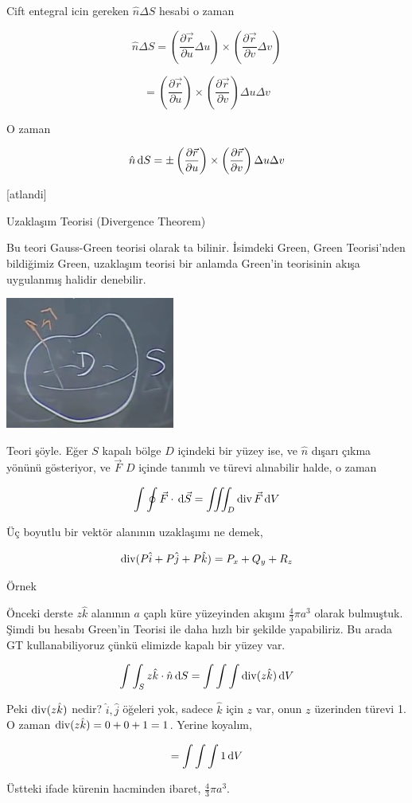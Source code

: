 \documentclass[12pt,fleqn]{article}\usepackage{../../common}
\begin{document}
Cift entegral icin gereken $\hat{n} \Delta S$ hesabi o zaman

$$
\hat{n} \Delta S =
\left( \frac{\partial \vec{r}}{\partial u} \Delta u \right) \times
\left( \frac{\partial \vec{r}}{\partial v} \Delta v \right) 
$$

$$
= \left( \frac{\partial \vec{r}}{\partial u} \right) \times
\left( \frac{\partial \vec{r}}{\partial v}  \right) \Delta u \Delta v
$$

O zaman

$$
\hat{n} \,\mathrm{d} S = \pm
\left( \frac{\partial \vec{r}}{\partial u} \right) \times
\left( \frac{\partial \vec{r}}{\partial v}  \right) \Delta u \Delta v
$$

[atlandi]

Uzaklaşım Teorisi (Divergence Theorem)

Bu teori Gauss-Green teorisi olarak ta bilinir. İsimdeki Green, Green
Teorisi'nden bildiğimiz Green, uzaklaşım teorisi bir anlamda Green'in teorisinin
akışa uygulanmış halidir denebilir.

\includegraphics[width=15em]{calc_multi_28_06.png}

Teori şöyle. Eğer $S$ kapalı bölge $D$ içindeki bir yüzey ise, ve $\hat{n}$
dışarı çıkma yönünü gösteriyor, ve $\vec{F}$ $D$ içinde tanımlı ve türevi
alınabilir halde, o zaman

$$
\int \oint \vec{F} \cdot \,\mathrm{d} \vec{S} =
\iiint_D \operatorname{div} \vec{F} \,\mathrm{d} V
$$

Üç boyutlu bir vektör alanının uzaklaşımı ne demek,

$$
\operatorname{div} (P \hat{i} + P \hat{j} + P \hat{k} ) = P_x + Q_y + R_z
$$

Örnek

Önceki derste $z \hat{k}$ alanının $a$ çaplı küre yüzeyinden akışını
$\frac{4}{3} \pi a^3$ olarak bulmuştuk. Şimdi bu hesabı Green'in Teorisi
ile daha hızlı bir şekilde yapabiliriz. Bu arada GT kullanabiliyoruz çünkü
elimizde kapalı bir yüzey var.

$$
\int \int_S z \hat{k} \cdot \hat{n} \,\mathrm{d} S =
\int \int \int \operatorname{div} (z\hat{k}) \,\mathrm{d} V
$$

Peki $\operatorname{div} (z\hat{k})$ nedir? $\hat{i},\hat{j}$ öğeleri yok, sadece
$\hat{k}$ için $z$ var, onun $z$ üzerinden türevi 1. O zaman
$\operatorname{div} (z\hat{k}) = 0 + 0 + 1 = 1$. Yerine koyalım,

$$
= \int \int \int 1 \,\mathrm{d} V
$$

Üstteki ifade kürenin hacminden ibaret, $\frac{4}{3} \pi a^3$. 
\end{document}
